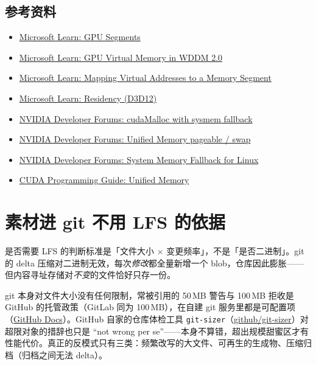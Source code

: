 \documentclass[a4paper, 12pt, linespread=1.35]{ctexart}   %
\begin{document}
\subsection{参考资料}

\begin{itemize}
  \item \href{https://learn.microsoft.com/en-us/windows-hardware/drivers/display/gpu-segments}{Microsoft Learn: GPU Segments}
  \item \href{https://learn.microsoft.com/en-us/windows-hardware/drivers/display/gpu-virtual-memory-in-wddm-2-0}{Microsoft Learn: GPU Virtual Memory in WDDM 2.0}
  \item \href{https://learn.microsoft.com/en-us/windows-hardware/drivers/display/mapping-virtual-addresses-to-a-memory-segment}{Microsoft Learn: Mapping Virtual Addresses to a Memory Segment}
  \item \href{https://learn.microsoft.com/en-us/windows/win32/direct3d12/residency}{Microsoft Learn: Residency (D3D12)}
  \item \href{https://forums.developer.nvidia.com/t/cudamalloc-with-sysmem-fallback/347791}{NVIDIA Developer Forums: cudaMalloc with sysmem fallback}
  \item \href{https://forums.developer.nvidia.com/t/unified-memory-is-pageable-it-can-be-swap-out-to-disk/328918}{NVIDIA Developer Forums: Unified Memory pageable / swap}
  \item \href{https://forums.developer.nvidia.com/t/system-memory-fallback-for-linux/296874}{NVIDIA Developer Forums: System Memory Fallback for Linux}
  \item \href{https://docs.nvidia.com/cuda/cuda-programming-guide/04-special-topics/unified-memory.html}{CUDA Programming Guide: Unified Memory}
\end{itemize}

\section{素材进 git 不用 LFS 的依据}
\label{app:vendor-lfs}

是否需要 LFS 的判断标准是「文件大小 $\times$ 变更频率」，不是「是否二进制」。git 的 delta 压缩对二进制无效，每次\emph{修改}都全量新增一个 blob，仓库因此膨胀——但内容寻址存储对\emph{不变}的文件恰好只存一份。

git 本身对文件大小没有任何限制，常被引用的 50\,MB 警告与 100\,MB 拒收是 GitHub 的托管政策（GitLab 同为 100\,MB），在自建 git 服务里都是可配置项（\href{https://docs.github.com/en/repositories/working-with-files/managing-large-files/about-large-files-on-github}{GitHub Docs}）。GitHub 自家的仓库体检工具 \texttt{git-sizer}（\href{https://github.com/github/git-sizer}{github/git-sizer}）对超限对象的措辞也只是 ``not wrong per se''——本身不算错，超出规模甜蜜区才有性能代价。真正的反模式只有三类：频繁改写的大文件、可再生的生成物、压缩归档（归档之间无法 delta）。
\end{document}
